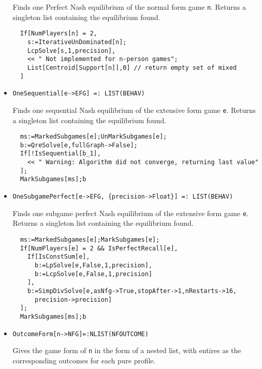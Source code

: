 \begin{itemize}
\bd 
Finds one Perfect Nash equilibrium of the normal form game
\verb+n+.  Returns a singleton list containing the equilibrium found.

\begin{verbatim}
  If[NumPlayers[n] = 2, 
    s:=IterativeUnDominated[n];
    LcpSolve[s,1,precision],
    << " Not implemented for n-person games";
    List[Centroid[Support[n]],0] // return empty set of mixed
  ]
\end{verbatim} 
\ed

\item{}
\protect \large \begin{verbatim}
OneSequential[e->EFG] =: LIST(BEHAV) 
\end{verbatim}\normalsize

\bd 
Finds one sequential Nash equilibrium of the extensive form game
\verb+e+.  Returns a singleton list containing the equilibrium found.

\begin{verbatim}
  ms:=MarkedSubgames[e];UnMarkSubgames[e];
  b:=QreSolve[e,fullGraph->False];
  If[!IsSequential[b_1],
    << " Warning: Algorithm did not converge, returning last value"
  ];
  MarkSubgames[ms];b
\end{verbatim} 
\ed

\item{}
\protect \large \begin{verbatim}
OneSubgamePerfect[e->EFG, {precision->Float}] =: LIST(BEHAV) 
\end{verbatim}\normalsize

\bd 
Finds one subgame perfect Nash equilibrium of the extensive form
game \verb+e+.  Returns a singleton list containing the equilibrium
found.

\begin{verbatim}
  ms:=MarkedSubgames[e];MarkSubgames[e];
  If[NumPlayers[e] = 2 && IsPerfectRecall[e],
    If[IsConstSum[e],
      b:=LpSolve[e,False,1,precision],
      b:=LcpSolve[e,False,1,precision]
    ],
    b:=SimpDivSolve[e,asNfg->True,stopAfter->1,nRestarts->16,
      precision->precision]
  ];
  MarkSubgames[ms];b
\end{verbatim} 
\ed

\item{}
\protect \large \begin{verbatim}
OutcomeForm[n->NFG]=:NLIST(NFOUTCOME)
\end{verbatim}\normalsize

\bd 
Gives the game form of \verb+n+ in the form of a nested list, with
entires as the corresponding outcomes for each pure profile. 


\end{itemize}
